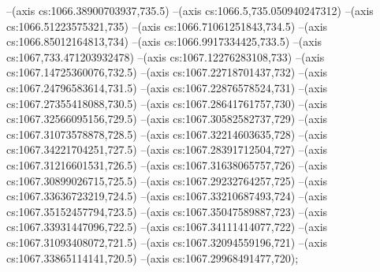 --(axis cs:1066.38900703937,735.5)
--(axis cs:1066.5,735.050940247312)
--(axis cs:1066.51223575321,735)
--(axis cs:1066.71061251843,734.5)
--(axis cs:1066.85012164813,734)
--(axis cs:1066.9917334425,733.5)
--(axis cs:1067,733.471203932478)
--(axis cs:1067.12276283108,733)
--(axis cs:1067.14725360076,732.5)
--(axis cs:1067.22718701437,732)
--(axis cs:1067.24796583614,731.5)
--(axis cs:1067.22876578524,731)
--(axis cs:1067.27355418088,730.5)
--(axis cs:1067.28641761757,730)
--(axis cs:1067.32566095156,729.5)
--(axis cs:1067.30582582737,729)
--(axis cs:1067.31073578878,728.5)
--(axis cs:1067.32214603635,728)
--(axis cs:1067.34221704251,727.5)
--(axis cs:1067.28391712504,727)
--(axis cs:1067.31216601531,726.5)
--(axis cs:1067.31638065757,726)
--(axis cs:1067.30899026715,725.5)
--(axis cs:1067.29232764257,725)
--(axis cs:1067.33636723219,724.5)
--(axis cs:1067.33210687493,724)
--(axis cs:1067.35152457794,723.5)
--(axis cs:1067.35047589887,723)
--(axis cs:1067.33931447096,722.5)
--(axis cs:1067.34111414077,722)
--(axis cs:1067.31093408072,721.5)
--(axis cs:1067.32094559196,721)
--(axis cs:1067.33865114141,720.5)
--(axis cs:1067.29968491477,720);

